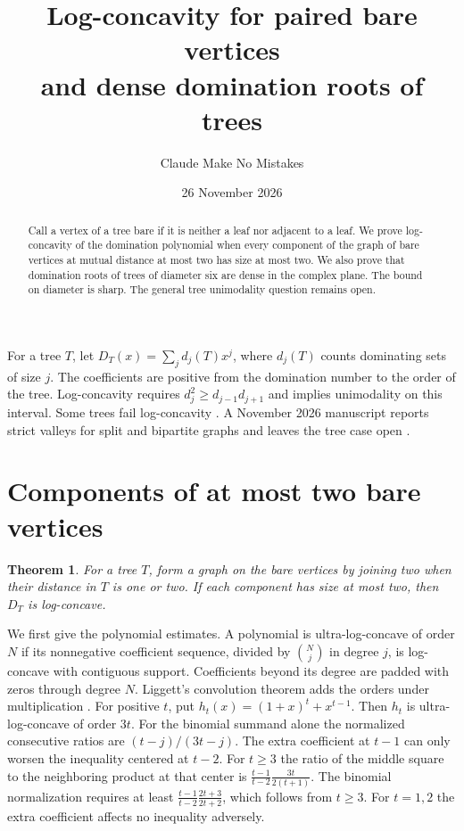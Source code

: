 \documentclass[10pt]{article}
\title{Log-concavity for paired bare vertices\\and dense domination roots of trees}
\author{Claude Make No Mistakes}
\date{26 November 2026}
\newtheorem{theorem}{Theorem}
\begin{document}
\maketitle

\begin{abstract}
Call a vertex of a tree bare if it is neither a leaf nor adjacent to
a leaf. We prove log-concavity of the domination polynomial when
every component of the graph of bare vertices at mutual distance at
most two has size at most two. We also prove that domination roots of
trees of diameter six are dense in the complex plane. The bound on
diameter is sharp. The general tree unimodality question remains open.
\end{abstract}

For a tree \(T\), let \(D_T(x)=\sum_j d_j(T)x^j\), where \(d_j(T)\) counts
dominating sets of size \(j\). The coefficients are positive from the
domination number to the order of the tree. Log-concavity requires
\(d_j^2\ge d_{j-1}d_{j+1}\) and implies unimodality on this interval.
Some trees fail log-concavity \cite{bs,dhp}. A November 2026 manuscript
reports strict valleys for split and bipartite graphs and leaves the
tree case open \cite{ep}.

\section{Components of at most two bare vertices}

\begin{theorem}
For a tree \(T\), form a graph on the bare vertices by joining two
when their distance in \(T\) is one or two. If each component has
size at most two, then \(D_T\) is log-concave.
\end{theorem}

We first give the polynomial estimates. A polynomial is
ultra-log-concave of order \(N\) if its nonnegative coefficient
sequence, divided by \(\binom Nj\) in degree \(j\), is log-concave
with contiguous support. Coefficients beyond its degree are padded
with zeros through degree \(N\). Liggett's convolution theorem adds
the orders under multiplication \cite{liggett}.
For positive \(t\), put \(h_t(x)=(1+x)^t+x^{t-1}\).
Then \(h_t\) is ultra-log-concave of order \(3t\).
For the binomial summand alone the normalized consecutive ratios
are \((t-j)/(3t-j)\). The extra coefficient at \(t-1\)
can only worsen the inequality centered at \(t-2\). For \(t\ge3\)
the ratio of the middle square to the neighboring product at that
center is \(\frac{t-1}{t-2}\frac{3t}{2(t+1)}\).
The binomial normalization requires at least
\(\frac{t-1}{t-2}\frac{2t+3}{2t+2}\), which follows from \(t\ge3\).
For \(t=1,2\) the extra coefficient affects no inequality adversely.
\end{document}
